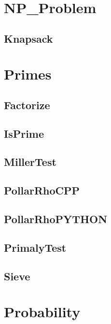 \section{NP_Problem}
\subsection{ Knapsack}
\raggedbottom
\hrulefill

\section{Primes}
\subsection{ Factorize}
\raggedbottom
\hrulefill
\subsection{ IsPrime}
\raggedbottom
\hrulefill
\subsection{ MillerTest}
\raggedbottom
\hrulefill
\subsection{ PollarRhoCPP}
\raggedbottom
\hrulefill
\subsection{ PollarRhoPYTHON}
\raggedbottom
\hrulefill
\subsection{ PrimalyTest}
\raggedbottom
\hrulefill
\subsection{ Sieve}
\raggedbottom
\hrulefill

\section{Probability}
